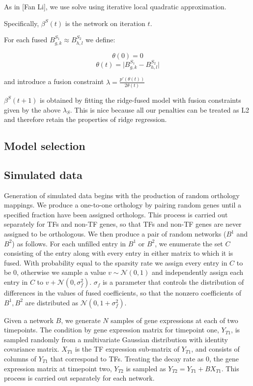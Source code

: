 \documentclass[11pt]{article}
\begin{document}
As in [Fan Li], we use solve using iterative local quadratic approximation. 

Specifically, $\beta^S(t)$ is the network on iteration $t$. 

For each fused $B^{S_1}_{g,k} \approx B^{S_2}_{h,l}$ we define:

\begin{equation} 
\theta(0)=0
\end{equation}
\begin{equation}
\theta(t) = \vert B^{S_1}_{g,k} - B^{S_2}_{h,l} \vert
\end{equation}

and introduce a fusion constraint $\lambda = \frac{p'(\theta(t))}{2\theta(t)} $

$\beta^S(t+1)$ is obtained by fitting the ridge-fused model with fusion constraints given by the above $\lambda_S$. This is nice because all our penalties can be treated as L2 and therefore retain the properties of ridge regression. 

\subsection{Model selection}


\subsection{Simulated data}
Generation of simulated data begins with the production of random orthology mappings. We produce a one-to-one orthology by pairing random genes until a specified fraction have been assigned orthologs. This process is carried out separately for TFs and non-TF genes, so that TFs and non-TF genes are never assigned to be orthologous. We then produce a pair of random networks ($B^1$ and $B^2$) as follows. For each unfilled entry in $B^1$ or $B^2$, we enumerate the set $C$ consisting of the entry along with every entry in either matrix to which it is fused. With probability equal to the sparsity rate we assign every entry in $C$ to be 0, otherwise we sample a value $v \sim \mathcal{N}(0,1)$ and independently assign each entry in $C$ to $v + \mathcal{N}(0, \sigma_f^2)$. $\sigma_f$ is a parameter that controls the distribution of differences in the values of fused coefficients, so that the nonzero coefficients of $B^1, B^2$ are distributed as $\mathcal{N}(0, 1 + \sigma_f^2)$.

Given a network $B$, we generate $N$ samples of gene expressions at each of two timepoints. The condition by gene expression matrix for timepoint one, $Y_{T1}$, is sampled randomly from a multivariate Gaussian distribution with identity covariance matrix. $X_{T1}$ is the TF expression sub-matrix of $Y_{T1}$, and consists of columns of $Y_{T1}$ that correspond to TFs. Treating the decay rate as 0, the gene expression matrix at timepoint two, $Y_{T2}$ is sampled as $Y_{T2} = Y_{T1} + BX_{T1}$. This process is carried out separately for each network. 
\end{document}
